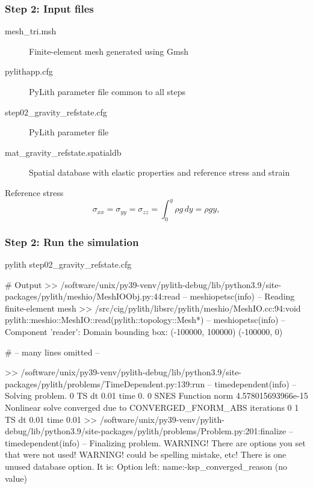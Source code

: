 \documentclass[aspectratio=169]{beamer}
\begin{document}
\begin{frame}
  \frametitle{Step 2: Input files}
  \summary{}

  \begin{description}
  \item[mesh\_tri.msh] Finite-element mesh generated using Gmsh
  \item[pylithapp.cfg] PyLith parameter file common to all steps
  \item[step02\_gravity\_refstate.cfg] PyLith parameter file
  \item[mat\_gravity\_refstate.spatialdb] Spatial database with elastic properties and reference stress and strain
  \end{description}

  \vfill
  Reference stress
  \begin{equation}
    \sigma_{xx} = \sigma_{yy} = \sigma_{zz} = \int_0^y \rho g \, dy = \rho g y,
  \end{equation}
  
\end{frame}


\begin{frame}[fragile]
  \frametitle{Step 2: Run the simulation}
  \summary{}

\begin{bashcode}
pylith step02_gravity_refstate.cfg

# Output
 >> /software/unix/py39-venv/pylith-debug/lib/python3.9/site-packages/pylith/meshio/MeshIOObj.py:44:read
 -- meshiopetsc(info)
 -- Reading finite-element mesh
 >> /src/cig/pylith/libsrc/pylith/meshio/MeshIO.cc:94:void pylith::meshio::MeshIO::read(pylith::topology::Mesh*)
 -- meshiopetsc(info)
 -- Component 'reader': Domain bounding box:
    (-100000, 100000)
    (-100000, 0)

# -- many lines omitted --

 >> /software/unix/py39-venv/pylith-debug/lib/python3.9/site-packages/pylith/problems/TimeDependent.py:139:run
 -- timedependent(info)
 -- Solving problem.
0 TS dt 0.01 time 0.
    0 SNES Function norm 4.578015693966e-15
  Nonlinear solve converged due to CONVERGED_FNORM_ABS iterations 0
1 TS dt 0.01 time 0.01
 >> /software/unix/py39-venv/pylith-debug/lib/python3.9/site-packages/pylith/problems/Problem.py:201:finalize
 -- timedependent(info)
 -- Finalizing problem.
WARNING! There are options you set that were not used!
WARNING! could be spelling mistake, etc!
There is one unused database option. It is:
Option left: name:-ksp_converged_reason (no value)
\end{bashcode}
  
\end{frame}
\end{document}
